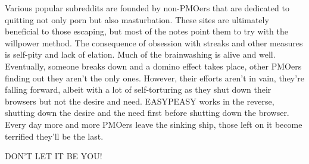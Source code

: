 \documentclass[easypeasy.tex]{subfiles}
\begin{document}
Various popular subreddits are founded by non-PMOers that are dedicated to quitting not only porn but also masturbation. These sites are ultimately beneficial to those escaping, but most of the notes point them to try with the willpower method. The consequence of obsession with streaks and other measures is self-pity and lack of elation. Much of the brainwashing is alive and well. Eventually, someone breaks down and a domino effect takes place, other PMOers finding out they aren't the only ones. However, their efforts aren't in vain, they're falling forward, albeit with a lot of self-torturing as they shut down their browsers but not the desire and need. EASYPEASY works in the reverse, shutting down the desire and the need first before shutting down the browser. Every day more and more PMOers leave the sinking ship, those left on it become terrified they'll be the last.

{\huge DON'T LET IT BE YOU!}
\end{document}
